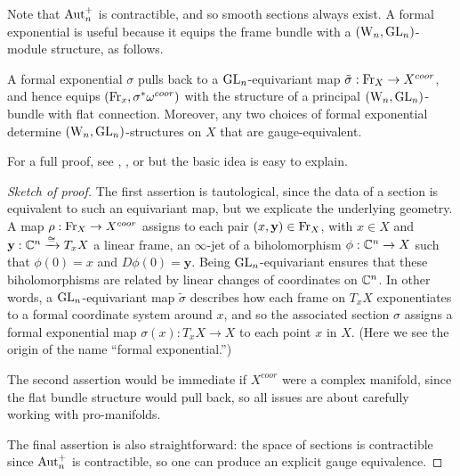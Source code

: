 Note that ${\rm Aut}_n^+$ is contractible, and so smooth sections always exist. 
A formal exponential is useful because it equips the frame bundle with a $({{\rm W}_n},{\rm GL}_n)$-module structure, as follows.

% 

\begin{prop} \label{gauge equiv}
A formal exponential $\sigma$ pulls back to a ${\rm GL}_n$-equivariant map $\tilde{\sigma} : {\rm Fr}_X \to X^{coor}$,
and hence equips $({\rm Fr}_x, \sigma^* \omega^{coor})$ with the structure
of a principal $({{\rm W}_n},{\rm GL}_n)$-bundle with flat connection.
Moreover, any two choices of formal exponential determine $({{\rm W}_n},{\rm GL}_n)$-structures on $X$ that are gauge-equivalent. 
\end{prop}

For a full proof, see \cite{NT}, \cite{nest1995}, or \cite{khors} but the basic idea is easy to explain.

\begin{proof}[Sketch of proof]
The first assertion is tautological, since the data of a section is equivalent to such an equivariant map, but we explicate the underlying geometry.
A map $\rho : {\rm Fr}_X \to X^{coor}$ assigns to each pair  $(x, \mathbf{y}) \in {\rm Fr}_X$,
with $x \in X$ and $\mathbf{y} : \mathbb C^n \xrightarrow{\cong} T_x X$ a linear frame,
an $\infty$-jet of a biholomorphism $\phi: \mathbb C^n \to X$ such that $\phi(0) = x$ and $D\phi(0) = \mathbf{y}$.
Being ${\rm GL}_n$-equivariant ensures that these biholomorphisms are related by linear changes of coordinates on $\mathbb C^n$.
In other words, a ${\rm GL}_n$-equivariant map $\tilde{\sigma}$ describes how each frame on $T_x X$ exponentiates to a formal coordinate system around $x$,
and so the associated section $\sigma$ assigns a formal exponential map $\sigma(x) \colon T_x X \to X$ to each point $x$ in $X$.
(Here we see the origin of the name ``formal exponential.'')

The second assertion would be immediate if $X^{coor}$ were a complex manifold, since the flat bundle structure would pull back,
so all issues are about carefully working with pro-manifolds.

The final assertion is also straightforward: the space of sections is contractible since ${\rm Aut}_n^+$ is contractible, 
so one can produce an explicit gauge equivalence.
\end{proof}

